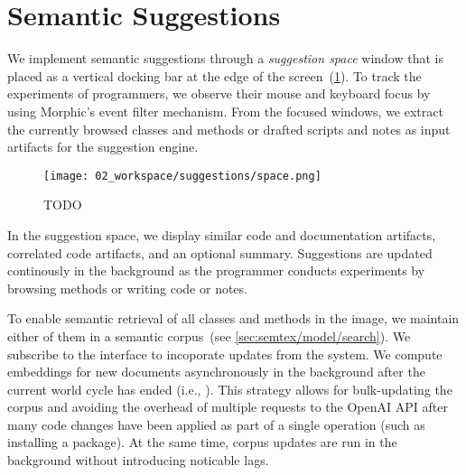
\section{Semantic Suggestions}
\label{sec:implementation/suggestions}

We implement semantic suggestions through a \emph{suggestion space} window that is placed as a vertical docking bar at the edge of the screen~(\cref{fig:implementation/suggestions/space}).
To track the experiments of programmers, we observe their mouse and keyboard focus by using Morphic's event filter mechanism.
From the focused windows, we extract the currently browsed classes and methods or drafted scripts and notes as input artifacts for the suggestion engine.

\begin{figure}
	\centering
	\texttt{[image: 02\_workspace/suggestions/space.png]}
	\caption[TODO]{
		TODO
	}
	\label{fig:implementation/suggestions/space}
\end{figure}

In the suggestion space, we display similar code and documentation artifacts, correlated code artifacts, and an optional summary.
Suggestions are updated continously in the background as the programmer conducts experiments by browsing methods or writing code or notes.

To enable semantic retrieval of all classes and methods in the image, we maintain either of them in a semantic corpus~(see \cref{sec:semtex/model/search}).
We subscribe to the  interface to incoporate updates from the system.
We compute embeddings for new documents asynchronously in the background after the current world cycle has ended (i.e., ).
This strategy allows for bulk-updating the corpus and avoiding the overhead of multiple requests to the OpenAI API after many code changes have been applied as part of a single operation (such as installing a package).
At the same time, corpus updates are run in the background without introducing noticable lags.
